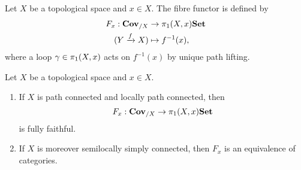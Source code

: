 \begin{defn}
    Let $X$ be a topological space and $x\in X$. The fibre functor is defined by
    \begin{align*}
        F_x: \catCoveringSpace_{/X} &\to \homotopy[1](X,x)\catSet\\
        (Y \xrightarrow{f} X) &\mapsto f^{-1}(x),
    \end{align*}
    where a loop $\gamma \in \homotopy[1](X,x)$ acts on $f^{-1}(x)$ by unique path lifting. 
\end{defn}

\begin{thm}[name=Monodromy correspondence]
    Let $X$ be a topological space and $x \in X$. 
    \begin{enumerate}
        \item If $X$ is path connected and locally path connected, then
        \[
            F_x: \catCoveringSpace_{/X} \to \homotopy[1](X,x)\catSet
        \] is fully faithful. 
        \item If $X$ is moreover semilocally simply connected, then $F_x$ is an equivalence of categories. 
    \end{enumerate}
\end{thm}
